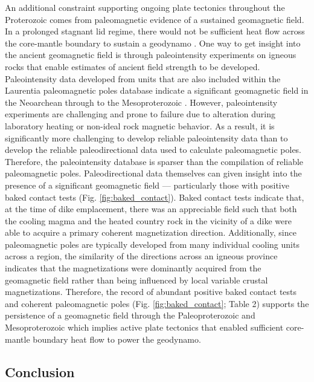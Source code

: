\documentclass[twocolumn, switch]{article} %
\begin{document}
An additional constraint supporting ongoing plate tectonics throughout the Proterozoic comes from paleomagnetic evidence of a sustained geomagnetic field. In a prolonged stagnant lid regime, there would not be sufficient heat flow across the core-mantle boundary to sustain a geodynamo \citep{Nimmo2000a, Buffett2000b}. One way to get insight into the ancient geomagnetic field is through paleointensity experiments on igneous rocks that enable estimates of ancient field strength to be developed.  Paleointensity data developed from units that are also included within the Laurentia paleomagnetic poles database indicate a significant geomagnetic field in the Neoarchean \citep{Selkin2000a} through to the Mesoproterozoic \citep{Macouin2006a, Sprain2018a}. However, paleointensity experiments are challenging and prone to failure due to alteration during laboratory heating or non-ideal rock magnetic behavior. As a result, it is significantly more challenging to develop reliable paleointensity data than to develop the reliable paleodirectional data used to calculate paleomagnetic poles. Therefore, the paleointensity database is sparser than the compilation of reliable paleomagnetic poles. Paleodirectional data themselves can given insight into the presence of a significant geomagnetic field --- particularly those with positive baked contact tests (Fig. \ref{fig:baked_contact}). Baked contact tests indicate that, at the time of dike emplacement, there was an appreciable field such that both the cooling magma and the heated country rock in the vicinity of a dike were able to acquire a primary coherent magnetization direction. Additionally, since paleomagnetic poles are typically developed from many individual cooling units across a region, the similarity of the directions across an igneous province indicates that the magnetizations were dominantly acquired from the geomagnetic field rather than being influenced by local variable crustal magnetizations.  Therefore, the record of abundant positive baked contact tests and coherent paleomagnetic poles (Fig. \ref{fig:baked_contact}; Table 2) supports the persistence of a geomagnetic field through the Paleoproterozoic and Mesoproterozoic which implies active plate tectonics that enabled sufficient core-mantle boundary heat flow to power the geodynamo.

\subsection{Conclusion}
\end{document}
